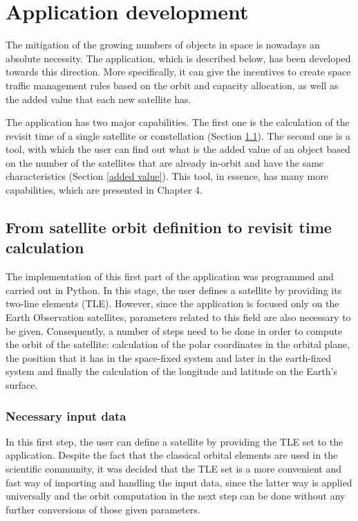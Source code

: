 \chapter{Application development}
\label{chap:3}
\bigskip

The mitigation of the growing numbers of objects in space is nowadays an absolute necessity. The application, which is described below, has been developed towards this direction. More specifically, it can give the incentives to create space traffic management rules based on the orbit and capacity allocation, as well as the added value that each new satellite has.

The application has two major capabilities. The first one is the calculation of the revisit time of a single satellite or constellation (Section \ref{revisit time}). The second one is a tool, with which the user can find out what is the added value of an object based on the number of the satellites that are already in-orbit and have the same characteristics (Section \ref{added value}). This tool, in essence, has many more capabilities, which are presented in Chapter 4.%

\bigskip
\section{From satellite orbit definition to revisit time calculation}
\label{revisit time}
\bigskip

The implementation of this first part of the application was programmed and carried out in Python. In this stage, the user defines a satellite by providing its two-line elements (TLE). However, since the application is focused only on the Earth Observation satellites, parameters related to this field are also necessary to be given. Consequently, a number of steps need to be done in order to compute the orbit of the satellite: calculation of the polar coordinates in the orbital plane, the position that it has in the space-fixed system and later in the earth-fixed system and finally the calculation of the longitude and latitude on the Earth's surface.

\bigskip
\subsection{Necessary input data}
\label{input_data}
\bigskip

In this first step, the user can define a satellite by providing the TLE set to the application. Despite the fact that the classical orbital elements are used in the scientific community, it was decided that the TLE set is a more convenient and fast way of importing and handling the input data, since the latter way is applied universally and the orbit computation in the next step can be done without any further conversions of those given parameters.

